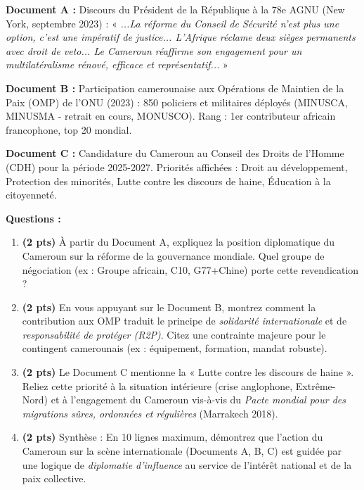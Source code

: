 \documentclass[11pt]{article}
\begin{document}
\begin{exercice}
\textbf{Document A :} Discours du Président de la République à la 78e AGNU (New York, septembre 2023) : « \emph{...La réforme du Conseil de Sécurité n'est plus une option, c'est une impératif de justice... L'Afrique réclame deux sièges permanents avec droit de veto... Le Cameroun réaffirme son engagement pour un multilatéralisme rénové, efficace et représentatif...} »

\textbf{Document B :} Participation camerounaise aux Opérations de Maintien de la Paix (OMP) de l'ONU (2023) : 850 policiers et militaires déployés (MINUSCA, MINUSMA - retrait en cours, MONUSCO). Rang : 1er contributeur africain francophone, top 20 mondial.

\textbf{Document C :} Candidature du Cameroun au Conseil des Droits de l'Homme (CDH) pour la période 2025-2027. Priorités affichées : Droit au développement, Protection des minorités, Lutte contre les discours de haine, Éducation à la citoyenneté.

\textbf{Questions :}
\begin{enumerate}
    \item \textbf{(2 pts)} À partir du Document A, expliquez la position diplomatique du Cameroun sur la réforme de la gouvernance mondiale. Quel groupe de négociation (ex : Groupe africain, C10, G77+Chine) porte cette revendication ?
    \item \textbf{(2 pts)} En vous appuyant sur le Document B, montrez comment la contribution aux OMP traduit le principe de \emph{solidarité internationale} et de \emph{responsabilité de protéger (R2P)}. Citez une contrainte majeure pour le contingent camerounais (ex : équipement, formation, mandat robuste).
    \item \textbf{(2 pts)} Le Document C mentionne la « Lutte contre les discours de haine ». Reliez cette priorité à la situation intérieure (crise anglophone, Extrême-Nord) et à l'engagement du Cameroun vis-à-vis du \emph{Pacte mondial pour des migrations sûres, ordonnées et régulières} (Marrakech 2018).
    \item \textbf{(2 pts)} Synthèse : En 10 lignes maximum, démontrez que l'action du Cameroun sur la scène internationale (Documents A, B, C) est guidée par une logique de \emph{diplomatie d'influence} au service de l'intérêt national et de la paix collective.
\end{enumerate}
\end{exercice}
\end{document}
